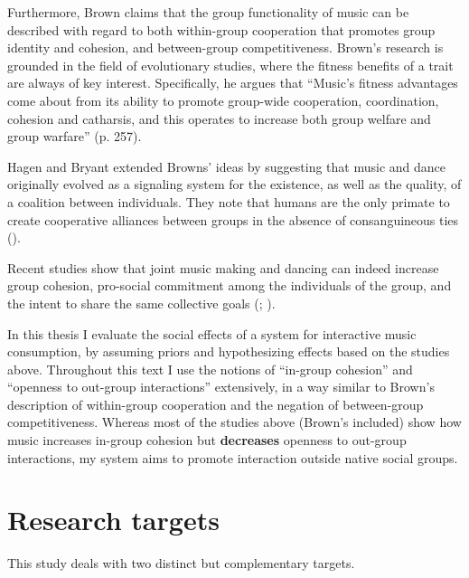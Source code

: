 \documentclass[a4paper,11pt]{article}
\begin{document}
Furthermore, Brown claims that the group functionality of music can be described with regard to both within-group cooperation that promotes group identity and cohesion, and between-group competitiveness.
Brown's research is grounded in the field of evolutionary studies, where the fitness benefits of a trait are always of key interest.
Specifically, he argues that ``Music's fitness advantages come about from its ability to promote group-wide cooperation, coordination, cohesion and catharsis, and this operates to increase both group welfare and group warfare'' (p. 257).

Hagen and Bryant extended Browns' ideas by suggesting that music and dance originally evolved as a signaling system for the existence, as well as the quality, of a coalition between individuals.
They note that humans are the only primate to create cooperative alliances between groups in the absence of consanguineous ties (\cite*{Hagen2003}).

Recent studies show that joint music making and dancing can indeed increase group cohesion, pro-social commitment among the individuals of the group, and the intent to share the same collective goals (\cite{Kirschner2010}; \cite{Knoblich2011}).

In this thesis I evaluate the social effects of a system for interactive music consumption, by assuming priors and hypothesizing effects based on the studies above.
Throughout this text I use the notions of ``in-group cohesion'' and ``openness to out-group interactions'' extensively, in a way similar to Brown's description of within-group cooperation and the negation of between-group competitiveness.
Whereas most of the studies above (Brown's included) show how music increases in-group cohesion but \textbf{decreases} openness to out-group interactions, my system aims to promote interaction outside native social groups.

\clearpage\section{Research targets}

This study deals with two distinct but complementary targets.
\end{document}
